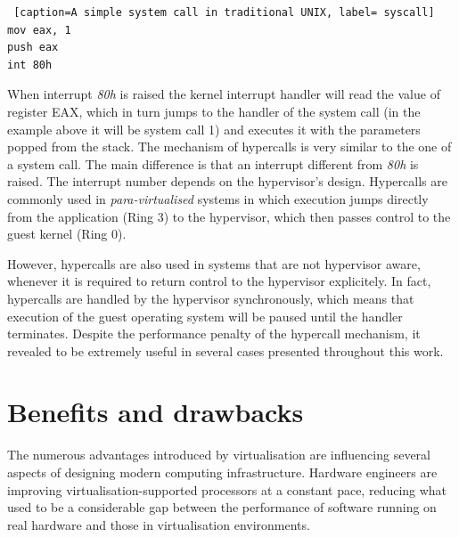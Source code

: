 \begin{lstlisting} [caption=A simple system call in traditional UNIX, label= syscall]
mov eax, 1
push eax
int 80h
\end{lstlisting}

When interrupt \emph{80h} is raised the kernel interrupt handler will read the value of register EAX, which in turn jumps to the handler of the system call (in the example above it will be system call 1) and executes it with the parameters popped from the stack.
The mechanism of hypercalls is very similar to the one of a system call. The main difference is that an interrupt different from \emph{80h} is raised. The interrupt number depends on the hypervisor's design.
Hypercalls are commonly used in \emph{para-virtualised} systems in which execution jumps directly from the application (Ring 3) to the hypervisor, which then passes control to the guest kernel (Ring 0). 

However, hypercalls are also used in systems that are not hypervisor aware, whenever it is required to return control to the hypervisor explicitely. In fact, hypercalls are handled by the hypervisor synchronously, which means that execution of the guest operating system will be paused until the handler terminates.
Despite the performance penalty of the hypercall mechanism, it revealed to be extremely useful in several cases  presented throughout this work.



\section{Benefits and drawbacks}
The numerous advantages introduced by virtualisation are influencing several aspects of designing modern computing infrastructure. Hardware engineers are improving virtualisation-supported processors at a constant pace, reducing what used to be a considerable gap between the performance of software running on real hardware and those in virtualisation environments.%

